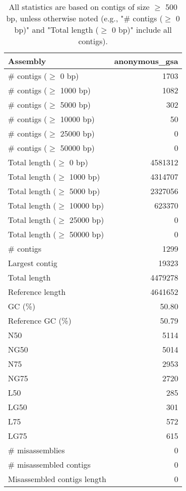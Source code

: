 \documentclass[12pt,a4paper]{article}
\begin{document}
\begin{table}[ht]
\begin{center}
\caption{All statistics are based on contigs of size $\geq$ 500 bp, unless otherwise noted (e.g., "\# contigs ($\geq$ 0 bp)" and "Total length ($\geq$ 0 bp)" include all contigs).}
\begin{tabular}{|l*{1}{|r}|}
\hline
Assembly & anonymous\_gsa \\ \hline
\# contigs ($\geq$ 0 bp) & 1703 \\ \hline
\# contigs ($\geq$ 1000 bp) & 1082 \\ \hline
\# contigs ($\geq$ 5000 bp) & 302 \\ \hline
\# contigs ($\geq$ 10000 bp) & 50 \\ \hline
\# contigs ($\geq$ 25000 bp) & 0 \\ \hline
\# contigs ($\geq$ 50000 bp) & 0 \\ \hline
Total length ($\geq$ 0 bp) & 4581312 \\ \hline
Total length ($\geq$ 1000 bp) & 4314707 \\ \hline
Total length ($\geq$ 5000 bp) & 2327056 \\ \hline
Total length ($\geq$ 10000 bp) & 623370 \\ \hline
Total length ($\geq$ 25000 bp) & 0 \\ \hline
Total length ($\geq$ 50000 bp) & 0 \\ \hline
\# contigs & 1299 \\ \hline
Largest contig & 19323 \\ \hline
Total length & 4479278 \\ \hline
Reference length & 4641652 \\ \hline
GC (\%) & 50.80 \\ \hline
Reference GC (\%) & 50.79 \\ \hline
N50 & 5114 \\ \hline
NG50 & 5014 \\ \hline
N75 & 2953 \\ \hline
NG75 & 2720 \\ \hline
L50 & 285 \\ \hline
LG50 & 301 \\ \hline
L75 & 572 \\ \hline
LG75 & 615 \\ \hline
\# misassemblies & 0 \\ \hline
\# misassembled contigs & 0 \\ \hline
Misassembled contigs length & 0 \\ \hline

\end{tabular}
\end{center}
\end{table}
\end{document}
